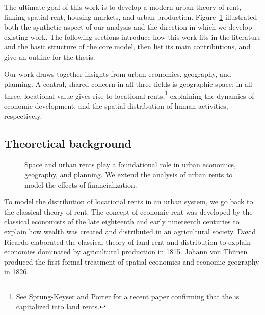 
The ultimate goal of this work is to develop a modern urban theory of rent, linking spatial rent, housing markets, and urban production. 
Figure~\ref{fig-fields} illustrated both the synthetic aspect of our analysis and the direction in which we develop existing work. The following sections introduce how this work fits in the literature and the basic structure of the core model, then list its main contributions, and give an outline for the thesis.

Our work draws together insights from urban economics, geography, and planning. A central, shared concern in all three fields is geographic space: in all three, locational value gives rise to locational rents,\footnote{See Sprung-Keyser and Porter \cite{medina-olivaresJointModelLongitudinal2023} for a recent paper confirming that the is capitalized into land rents.}  explaining the dynamics of economic development, and the spatial distribution of human activities, respectively. 

\subsection{Theoretical background}

    
    \begin{figure}[!ht]
    \centering
    
    \caption[Linking space and urban rents to the effects of financialization.]{Space and urban rents play a foundational role in urban economics, geography, and planning. We extend the analysis of urban rents to model the effects of financialization.}
    \label{fig-fields}
    \end{figure}


To model the distribution of locational rents in an urban system, we go back to the classical theory of rent. The concept of economic rent was developed by the classical economists of the late eighteenth and early nineteenth centuries to explain how wealth was created and distributed in an agricultural society. David Ricardo \cite{ricardoEssayInfluenceLow1815} elaborated the classical theory of land rent and distribution to explain economies dominated by agricultural production in 1815.
Johann von Th\"unen \cite{vonthunenIsolirteStaatBeziehung1826} produced the first formal treatment of spatial economics and economic geography in 1826. 

